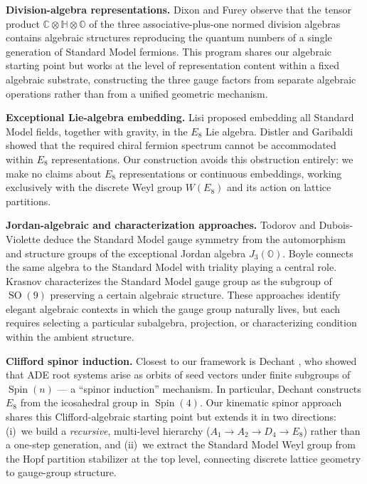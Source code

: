 \documentclass[11pt,reqno]{amsart}
\theoremstyle{plain}
\theoremstyle{definition}
\theoremstyle{remark}
\newcommand{\C}{\mathbb{C}}
\newcommand{\HH}{\mathbb{H}}
\newcommand{\OO}{\mathbb{O}}
\DeclareMathOperator{\Spin}{Spin}
\DeclareMathOperator{\SO}{SO}
\begin{document}
\medskip
\noindent\textbf{Division-algebra representations.}\quad
Dixon \cite{Dixon1994} and Furey \cite{Furey2016} observe that
the tensor product $\C\otimes\HH\otimes\OO$ of the three
associative-plus-one normed division algebras contains algebraic
structures reproducing the quantum numbers of a single generation
of Standard Model fermions.
This program shares our algebraic starting point but works at the
level of representation content within a fixed algebraic substrate,
constructing the three gauge factors from separate algebraic
operations rather than from a unified geometric mechanism.

\medskip
\noindent\textbf{Exceptional Lie-algebra embedding.}\quad
Lisi \cite{Lisi2007} proposed embedding all Standard Model fields,
together with gravity, in the $E_8$ Lie algebra.
Distler and Garibaldi \cite{DistlerGaribaldi2009} showed that
the required chiral fermion spectrum cannot be accommodated within
$E_8$ representations.
Our construction avoids this obstruction entirely: we make no
claims about $E_8$ representations or continuous embeddings,
working exclusively with the discrete Weyl group $W(E_8)$ and
its action on lattice partitions.

\medskip
\noindent\textbf{Jordan-algebraic and characterization approaches.}\quad
Todorov and Dubois-Violette \cite{TodorovDuboisViolette2018}
deduce the Standard Model gauge symmetry from the automorphism
and structure groups of the exceptional Jordan algebra
$J_3(\OO)$.
Boyle \cite{Boyle2020} connects the same algebra to the
Standard Model with triality playing a central role.
Krasnov \cite{Krasnov2019} characterizes the Standard Model
gauge group as the subgroup of $\SO(9)$ preserving a certain
algebraic structure.
These approaches identify elegant algebraic contexts in
which the gauge group naturally lives, but each requires
selecting a particular subalgebra, projection, or
characterizing condition within the ambient structure.

\medskip
\noindent\textbf{Clifford spinor induction.}\quad
Closest to our framework is Dechant \cite{Dechant2016}, who
showed that ADE root systems arise as orbits of seed vectors
under finite subgroups of $\Spin(n)$ --- a ``spinor induction''
mechanism.
In particular, Dechant constructs $E_8$ from the icosahedral
group in $\Spin(4)$.
Our kinematic spinor approach shares this Clifford-algebraic
starting point but extends it in two directions:
(i)~we build a \emph{recursive}, multi-level hierarchy
($A_1 \to A_2 \to D_4 \to E_8$) rather than a one-step
generation, and
(ii)~we extract the Standard Model Weyl group from the Hopf
partition stabilizer at the top level, connecting discrete
lattice geometry to gauge-group structure.
\end{document}

